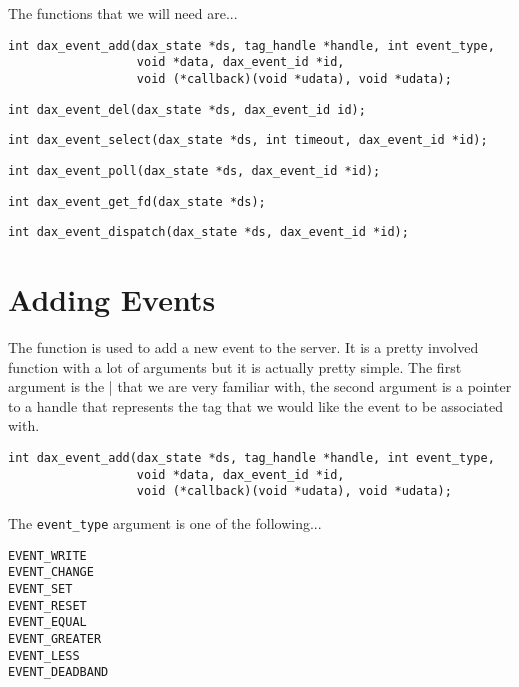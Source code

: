 The functions that we will need are...

\begin{verbatim}
int dax_event_add(dax_state *ds, tag_handle *handle, int event_type,
                  void *data, dax_event_id *id,
                  void (*callback)(void *udata), void *udata);
\end{verbatim}
\begin{verbatim}
int dax_event_del(dax_state *ds, dax_event_id id);
\end{verbatim}
\begin{verbatim}
int dax_event_select(dax_state *ds, int timeout, dax_event_id *id);
\end{verbatim}
\begin{verbatim}
int dax_event_poll(dax_state *ds, dax_event_id *id);
\end{verbatim}
\begin{verbatim}
int dax_event_get_fd(dax_state *ds);
\end{verbatim}
\begin{verbatim}
int dax_event_dispatch(dax_state *ds, dax_event_id *id);
\end{verbatim}

\section{Adding Events}

The \eventadd{} function is used to add a new event to the server.  It is a pretty involved function with a lot of arguments but it is actually pretty simple.  The first argument is the \daxstate| that we are very familiar with, the second argument is a pointer to a handle that represents the tag that we would like the event to be associated with.

\begin{verbatim}
int dax_event_add(dax_state *ds, tag_handle *handle, int event_type,
                  void *data, dax_event_id *id,
                  void (*callback)(void *udata), void *udata);
\end{verbatim}

The \texttt{event\_type} argument is one of the following...

\begin{verbatim}
EVENT_WRITE
EVENT_CHANGE
EVENT_SET
EVENT_RESET
EVENT_EQUAL
EVENT_GREATER
EVENT_LESS
EVENT_DEADBAND
\end{verbatim}

